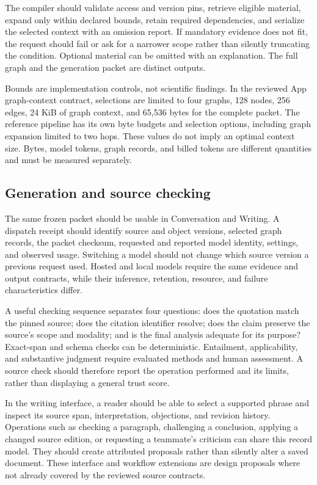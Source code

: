 \documentclass[
  11pt,
]{article}
\begin{document}
The compiler should validate access and version pins, retrieve eligible
material, expand only within declared bounds, retain required
dependencies, and serialize the selected context with an omission
report. If mandatory evidence does not fit, the request should fail or
ask for a narrower scope rather than silently truncating the condition.
Optional material can be omitted with an explanation. The full graph and
the generation packet are distinct outputs.

Bounds are implementation controls, not scientific findings. In the
reviewed App graph-context contract, selections are limited to four
graphs, 128 nodes, 256 edges, 24 KiB of graph context, and 65,536 bytes
for the complete packet. The reference pipeline has its own byte budgets
and selection options, including graph expansion limited to two hops.
These values do not imply an optimal context size. Bytes, model tokens,
graph records, and billed tokens are different quantities and must be
measured separately.

\subsection{Generation and source
checking}\label{generation-and-source-checking}

The same frozen packet should be usable in Conversation and Writing. A
dispatch receipt should identify source and object versions, selected
graph records, the packet checksum, requested and reported model
identity, settings, and observed usage. Switching a model should not
change which source version a previous request used. Hosted and local
models require the same evidence and output contracts, while their
inference, retention, resource, and failure characteristics differ.

A useful checking sequence separates four questions: does the quotation
match the pinned source; does the citation identifier resolve; does the
claim preserve the source's scope and modality; and is the final
analysis adequate for its purpose? Exact-span and schema checks can be
deterministic. Entailment, applicability, and substantive judgment
require evaluated methods and human assessment. A source check should
therefore report the operation performed and its limits, rather than
displaying a general trust score.

In the writing interface, a reader should be able to select a supported
phrase and inspect its source span, interpretation, objections, and
revision history. Operations such as checking a paragraph, challenging a
conclusion, applying a changed source edition, or requesting a
teammate's criticism can share this record model. They should create
attributed proposals rather than silently alter a saved document. These
interface and workflow extensions are design proposals where not already
covered by the reviewed source contracts.
\end{document}
